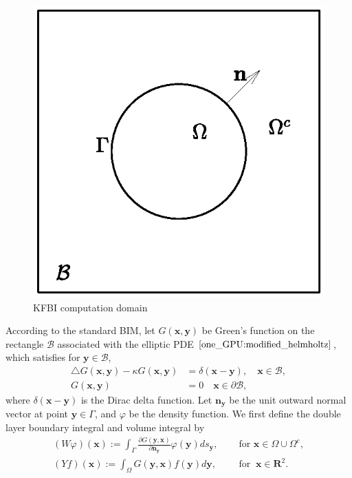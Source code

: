 \begin{figure}[htpt!]
    \centering
    \includegraphics[width = 0.8\linewidth]{figure/one_gpu_kfbi1.eps}
    \caption{KFBI computation domain}
    \label{kfbi domain}
\end{figure}

According to the standard BIM\cite{aliabadi2011boundary,yu2002natural}, let $G(\mathbf{x}, \mathbf{y})$ be  Green's function on the rectangle $\mathcal{B}$ associated with the elliptic PDE $\eqref{one_GPU:modified_helmholtz}$, which satisfies for $\mathbf{y} \in \mathcal{B}$,
\begin{align}
\triangle G(\mathbf{x}, \mathbf{y})-\kappa G(\mathbf{x}, \mathbf{y}) &= \delta(\mathbf{x}-\mathbf{y}), \quad \mathbf{x} \in \mathcal{B}, \\
G(\mathbf{x}, \mathbf{y}) &=0 \quad \mathbf{x} \in \partial \mathcal{B},
\end{align}
where $\delta(\mathbf{x} - \mathbf{y})$ is the Dirac delta function. Let $\mathbf{n}_{\mathbf{y}}$ be the unit outward normal vector at point $\mathbf{y}\in \Gamma$, and $\varphi$ be the density function. We first define the double layer boundary integral and volume integral by
\begin{align}
(W \varphi)(\mathbf{x}) := \int_{\Gamma} \frac{\partial G(\mathbf{y}, \mathbf{x})}{\partial \mathbf{n}_{\mathbf{y}}} \varphi(\mathbf{y}) d s_{\mathbf{y}}, \quad & \text { for } \mathbf{x} \in \Omega \cup \Omega^{c},\label{one_GPU:double} \\
(Yf)(\mathbf{x}) := \int_{\Omega} G(\mathbf{y}, \mathbf{x})f(\mathbf{y}) d\mathbf{y}, \quad & \text{ for } ~\mathbf{x} \in \mathbf{R}^{2}.
    \label{one_GPU:volume}
\end{align}


